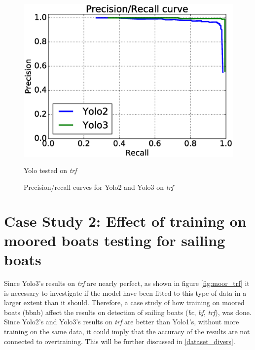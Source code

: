 \begin{figure}[h!]
  \centering
  \includegraphics[width=0.8\linewidth]{results/case_buildings/prec_recall/yolo/trf.eps}
  \caption{Yolo tested on \textit{trf}}
  \label{fig:ex_trf_prec_rec_yolo}
\caption{Precision/recall curves for Yolo2 and Yolo3 on \textit{trf}}
\label{fig:yolo_trf_prec}
\end{figure}

\newpage
\clearpage

\section{Case Study 2: Effect of training on moored boats testing for sailing boats}
\label{sec:moored_boats}

Since Yolo3's results on \textit{trf} are nearly perfect, as shown in figure \ref{fig:moor_trf} it is necessary to investigate if the model have been fitted to this type of data in a larger extent than it should. Therefore, a case study of how training on moored boats (bbnb) affect the results on detection of sailing boats (\textit{bc}, \textit{bf}, \textit{trf}), was done. Since Yolo2's and Yolo3's results on \textit{trf} are better than Yolo1's, without more training on the same data, it could imply that the accuracy of the results are not connected to overtraining. This will be further discussed in \ref{dataset_divers}.


